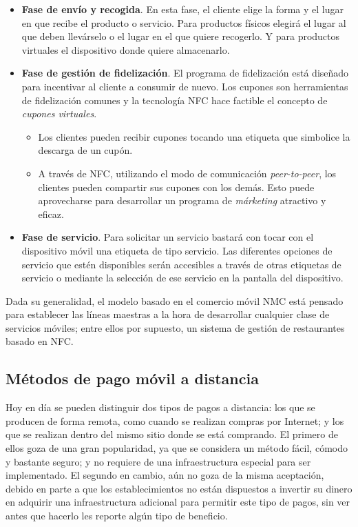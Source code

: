 \begin{itemize}
\begin{itemize}
    \end{itemize}
  \item \textbf{Fase de envío y recogida}. En esta fase, el cliente elige
  la forma y el lugar en que recibe el producto o servicio. Para productos
  físicos elegirá el lugar al que deben llevárselo o el lugar en el que quiere
  recogerlo. Y para productos virtuales el dispositivo donde quiere
  almacenarlo.
  \item \textbf{Fase de gestión de fidelización}. El programa de fidelización
  está diseñado para incentivar al cliente a consumir de nuevo. Los cupones son
  herramientas de fidelización comunes y la tecnología \acs{NFC} hace factible
  el concepto de \emph{cupones virtuales}.
    \begin{itemize}
    \item Los clientes pueden recibir cupones tocando una etiqueta que 
    simbolice la descarga de un cupón.
    \item A través de \acs{NFC}, utilizando el modo de comunicación
    \emph{peer-to-peer}, los clientes pueden compartir sus cupones con los
    demás. Esto puede aprovecharse para desarrollar un programa de
    \emph{márketing} atractivo y eficaz.
    \end{itemize}
  \item \textbf{Fase de servicio}. Para solicitar un servicio bastará con
  tocar con el dispositivo móvil una etiqueta de tipo servicio. Las diferentes
  opciones de servicio que estén disponibles serán accesibles a través de
  otras etiquetas de servicio o mediante la selección de ese servicio en la
  pantalla del dispositivo.
  \end{itemize}
  
  Dada su generalidad, el modelo basado en el comercio móvil \acs{NMC} está 
  pensado para establecer las líneas maestras a la hora de desarrollar 
  cualquier clase de servicios móviles; entre ellos por supuesto, un sistema
  de gestión de restaurantes basado en \acs{NFC}.

    \subsection{Métodos de pago móvil a distancia}
  Hoy en día se pueden distinguir dos tipos de pagos a distancia: los que se
  producen de forma remota, como cuando se realizan compras por Internet;
  y los que se realizan dentro del mismo sitio donde se está
  comprando. El primero de ellos goza de una gran popularidad, ya que se
  considera un método fácil, cómodo y bastante seguro; y no requiere de una
  infraestructura especial para ser implementado. El segundo en cambio,
  aún no goza de la misma aceptación, debido en parte a que los 
  establecimientos no están dispuestos a invertir su dinero en adquirir una 
  infraestructura adicional para permitir este tipo de pagos, sin ver antes 
  que hacerlo les reporte algún tipo de beneficio.

